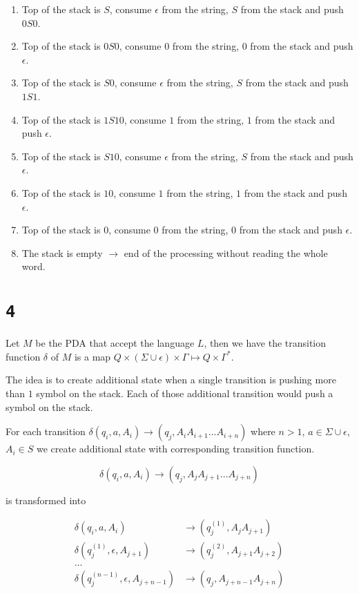 \documentclass[a4paper,11pt]{report}
\begin{document}
\begin{enumerate}
\item Top of the stack is $S$, consume $\epsilon$ from the string, $S$ from the stack and push $0S0$.
\item Top of the stack is $0S0$, consume $0$ from the string, $0$ from the stack and push $\epsilon$.
\item Top of the stack is $S0$, consume $\epsilon$ from the string, $S$ from the stack and push $1S1$.
\item Top of the stack is $1S10$, consume $1$ from the string, $1$ from the stack and push $\epsilon$.
\item Top of the stack is $S10$, consume $\epsilon$ from the string, $S$ from the stack and push $\epsilon$.
\item Top of the stack is $10$, consume $1$ from the string, $1$ from the stack and push $\epsilon$.
\item Top of the stack is $0$, consume $0$ from the string, $0$ from the stack and push $\epsilon$.
\item The stack is empty $\to$ end of the processing without reading the whole word.
\end{enumerate}

\section*{\texttt{4}}

Let $M$ be the PDA that accept the language $L$, then we have the transition
function $\delta$ of $M$ is a map $Q \times (\Sigma \cup \epsilon ) \times \Gamma
\mapsto Q \times \Gamma^*$.

The idea is to create additional state when a single transition is pushing
more than $1$ symbol on the stack. Each of those additional transition would
push a symbol on the stack.

For each transition $\delta(q_i,a,A_i) \to (q_j,A_iA_{i+1}\dots A_{i+n})$ where
$n > 1$, $a \in \Sigma \cup \epsilon$, $A_i \in S$ we create additional state with
corresponding transition function.


\[
  \delta(q_i,a,A_i) \to (q_j,A_jA_{j+1}\dots A_{j+n})
\]

is transformed into

\begin{align*}
  \delta(q_i,a,A_i) &\to (q_j^{(1)},A_jA_{j+1}) \\
  \delta(q_j^{(1)},\epsilon,A_{j+1}) &\to (q_j^{(2)},A_{j+1}A_{j+2}) \\
  \dots \\
  \delta(q_j^{(n-1)}, \epsilon,A_{j+n-1}) &\to (q_j,A_{j+n-1}A_{j+n}) \\
\end{align*}
\end{document}
